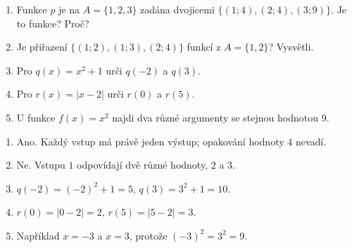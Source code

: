 \documentclass[11pt,a4paper]{article}
\begin{document}
\begin{zadaniReseniBox}[title={Samostatná práce 1}]
\begin{enumerate}[label=\alph*)]
\item Funkce $p$ je na $A=\{1,2,3\}$ zadána dvojicemi
$\{(1;4),(2;4),(3;9)\}$. Je to funkce? Proč?
\item Je přiřazení $\{(1;2),(1;3),(2;4)\}$ funkcí
z $A=\{1,2\}$? Vysvětli.
\item Pro $q(x)=x^2+1$ urči $q(-2)$ a $q(3)$.
\item Pro $r(x)=|x-2|$ urči $r(0)$ a $r(5)$.
\item U funkce $f(x)=x^2$ najdi dva různé argumenty se stejnou hodnotou $9$.
\end{enumerate}
\tcblower
\begin{enumerate}[label=\alph*)]
\item Ano. Každý vstup má právě jeden výstup; opakování hodnoty $4$ nevadí.
\item Ne. Vstupu $1$ odpovídají dvě různé hodnoty, $2$ a $3$.
\item $q(-2)=(-2)^2+1=5$, $q(3)=3^2+1=10$.
\item $r(0)=|0-2|=2$, $r(5)=|5-2|=3$.
\item Například $x=-3$ a $x=3$, protože $(-3)^2=3^2=9$.
\end{enumerate}
\end{zadaniReseniBox}

\end{document}
